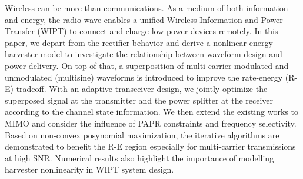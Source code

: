Wireless can be more than communications. As a medium of both information and energy, the radio wave enables a unified Wireless Information and Power Transfer (WIPT) to connect and charge low-power devices remotely. In this paper, we depart from the rectifier behavior and derive a nonlinear energy harvester model to investigate the relationship between waveform design and power delivery. On top of that, a superposition of multi-carrier modulated and unmodulated (multisine) waveforms is introduced to improve the rate-energy (R-E) tradeoff. With an adaptive transceiver design, we jointly optimize the superposed signal at the transmitter and the power splitter at the receiver according to the channel state information. We then extend the existing works to MIMO and consider the influence of PAPR constraints and frequency selectivity. Based on non-convex posynomial maximization, the iterative algorithms are demonstrated to benefit the R-E region especially for multi-carrier transmissions at high SNR. Numerical results also highlight the importance of modelling harvester nonlinearity in WIPT system design. 